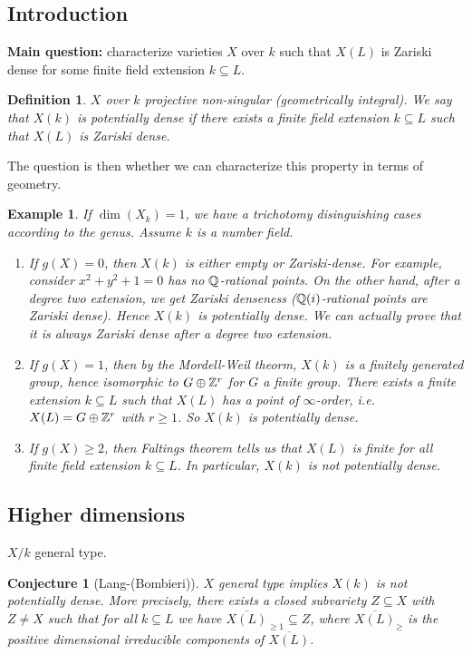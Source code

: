 \documentclass[A4paper, british, reqno]{amsart}
\theoremstyle{darkgreentheorem}
\newtheorem{conj}[thm]{Conjecture}
\theoremstyle{darkbluedefinition}
\newtheorem{defn}[thm]{Definition}
\theoremstyle{darkredexample}
\newtheorem{exa}[thm]{Example}
\theoremstyle{remark}
\newcommand{\1}{\mathbbm{1}}
\newcommand{\op}{\oplus}
\newcommand{\sub}{\subseteq}
\begin{document}
\subsection{Introduction}

\textbf{Main question:} characterize varieties $X$ over $k$ such that $X(L)$ is Zariski dense for some finite field extension $k\sub L$.

\begin{defn}
    $X$ over $k$ projective non-singular (geometrically integral).
    We say that $X(k)$ is \textit{potentially dense} if there exists a finite field extension $k\sub L$ such that $X(L)$ is Zariski dense.
\end{defn}

The question is then whether we can characterize this property in terms of geometry.

\begin{exa}
    If $\dim(X_{k})=1$, we have a trichotomy disinguishing cases according to the genus.
    Assume $k$ is a number field.
    \begin{enumerate}
	\item If $g(X)=0$, then $X(k)$ is either empty or Zariski-dense.
	    For example, consider $x^{2}+y^{2}+1=0$ has no $\mathbb{Q}$-rational points.
	    On the other hand, after a degree two extension, we get Zariski denseness ($\mathbb{Q}(i)$-rational points are Zariski dense).
	    Hence $X(k)$ is potentially dense.
	    We can actually prove that it is always Zariski dense after a degree two extension.
	\item If $g(X)=1$, then by the Mordell-Weil theorm, $X(k)$ is a finitely generated group, hence isomorphic to $G\op \Z^{r}$ for $G$ a finite group.
	    There exists a finite extension $k\sub L$ such that $X(L)$ has a point of $\infty$-order, i.e. $X(L)=G\op \Z^{r}$ with $r\geqslant 1$.
	    So $X(k)$ is potentially dense.
	\item If $g(X)\geqslant 2$, then Faltings theorem tells us that $X(L)$ is finite for all finite field extension $k\sub L$.
	    In particular, $X(k)$ is not potentially dense.
    \end{enumerate}
\end{exa}

\subsection{Higher dimensions}

$X/k$ general type.

\begin{conj}[Lang-(Bombieri)]
    $X$ general type implies $X(k)$ is not potentially dense.
    More precisely, there exists a closed subvariety $Z\sub X$ with $Z\neq X$ such that for all $k\sub L$ we have $\overline{X(L)}_{\geqslant 1}\sub Z$, where $\overline{X(L)}_{\geqslant}$ is the positive dimensional irreducible components of $\overline{X(L)}$.
\end{conj}
\end{document}
